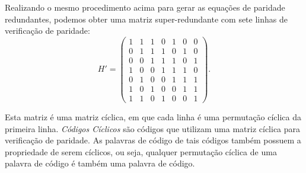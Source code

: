 \begin{frame}[allowframebreaks]
     Realizando o mesmo procedimento acima para gerar as equações de paridade redundantes, podemos obter uma
     matriz super-redundante com sete linhas de verificação de paridade:
        \begin{equation}
        H' = 
        \begin{pmatrix}
        1 & 1 & 1 & 0 & 1 & 0 & 0 \\
        0 & 1 & 1 & 1 & 0 & 1 & 0 \\
        0 & 0 & 1 & 1 & 1 & 0 & 1 \\
        1 & 0 & 0 & 1 & 1 & 1 & 0 \\
	0 & 1 & 0 & 0 & 1 & 1 & 1 \\
	1 & 0 & 1 & 0 & 0 & 1 & 1 \\
	1 & 1 & 0 & 1 & 0 & 0 & 1
        \end{pmatrix}.
        \end{equation}

     Esta matriz é uma matriz cíclica, em que cada linha é uma permutação cíclica da primeira linha.
     \textit{Códigos Cíclicos} são códigos que utilizam uma matriz cíclica para verificação de paridade.
     As palavras de código de tais códigos também possuem a propriedade de serem cíclicos, ou seja,
     qualquer permutação cíclica de uma palavra de código é também uma palavra de código.
\end{frame}
